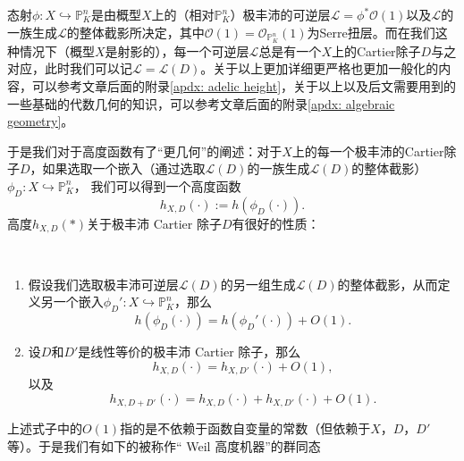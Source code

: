 态射$\phi: X \hookrightarrow \mathbb{P}^n_K$是由概型$X$上的（相对$\mathbb{P}^n_K$）极丰沛的可逆层$\mathscr{L} = \phi^{\ast}\mathcal{O}(1)$以及$\mathscr{L}$的一族生成$\mathscr{L}$的整体截影所决定，其中$\mathcal{O}(1) = \mathcal{O}_{\mathbb P^n_K}(1)$为Serre扭层。而在我们这种情况下（概型$X$是射影的），每一个可逆层$\mathscr{L}$总是有一个$X$上的Cartier除子$D$与之对应，此时我们可以记$\mathscr{L} = \mathscr{L}(D)$。关于以上更加详细更严格也更加一般化的内容，可以参考文章后面的附录\ref{apdx: adelic height}，关于以上以及后文需要用到的一些基础的代数几何的知识，可以参考文章后面的附录\ref{apdx: algebraic geometry}。

于是我们对于高度函数有了``更几何''的阐述：对于$X$上的每一个极丰沛的Cartier除子$D$，如果选取一个嵌入（通过选取$\mathscr{L}(D)$的一族生成$\mathscr{L}(D)$的整体截影）$\phi_D:X\hookrightarrow\mathbb P^n_K$，
我们可以得到一个高度函数
\begin{equation}
h_{X,D}(\cdot) := h(\phi_D(\cdot)).
\end{equation}
高度$h_{X,D}(\ast)$关于极丰沛 Cartier 除子$D$有很好的性质：
\begin{proposition} \label{height by divisor} \ 
\begin{enumerate}
\item 假设我们选取极丰沛可逆层$\mathscr{L}(D)$的另一组生成$\mathscr{L}(D)$的整体截影，从而定义另一个嵌入$\phi_D':X\hookrightarrow\mathbb P^n_K$，那么
\begin{equation}
h(\phi_D(\cdot)) = h(\phi_D'(\cdot)) + O(1).
\end{equation}
\item 设$D$和$D'$是线性等价的极丰沛 Cartier 除子，那么
\begin{equation}
h_{X,D}(\cdot) = h_{X,D'}(\cdot) + O(1),
\end{equation}
以及
\begin{equation}
h_{X,D+D'}(\cdot) = h_{X,D}(\cdot) + h_{X,D'}(\cdot) + O(1).
\end{equation}
\end{enumerate}
\end{proposition}
上述式子中的$O(1)$指的是不依赖于函数自变量的常数（但依赖于$X$，$D$，$D'$等）。于是我们有如下的被称作`` Weil 高度机器''的群同态

